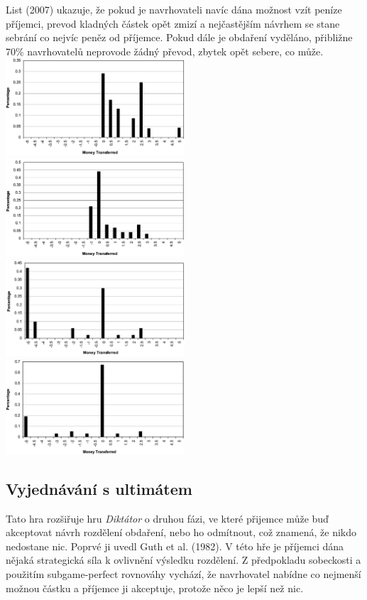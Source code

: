 \documentclass[a5paper,12pt]{article}
\begin{document}
      List (2007) ukazuje, že pokud je navrhovateli navíc dána možnost vzít peníze příjemci, prevod kladných částek
      opět zmizí a nejčastějším návrhem se stane sebrání co nejvíc peněz od příjemce. Pokud dále je obdaření vyděláno,
      přibližne 70\% navrhovatelů neprovode žádný převod, zbytek opět sebere, co může.\\
      \includegraphics[width=0.5\textwidth]{list1.png}
      \includegraphics[width=0.5\textwidth]{list2.png}\\
      \includegraphics[width=0.5\textwidth]{list3.png}
      \includegraphics[width=0.5\textwidth]{list4.png}\\
    \subsection{Vyjednávání s ultimátem}
      Tato hra rozšiřuje hru \emph{Diktátor} o druhou fázi, ve které přijemce může buď akceptovat návrh rozdělení
      obdaření, nebo ho odmítnout, což znamená, že nikdo nedostane nic. Poprvé ji uvedl Guth et al. (1982).
      V této hře je příjemci dána nějaká strategická síla k ovlivnění výsledku rozdělení.
      Z předpokladu sobeckosti a použitím subgame-perfect rovnováhy vychází, že navrhovatel nabídne co nejmenší
      možnou částku a příjemce ji akceptuje, protože něco je lepší než nic.
\end{document}

